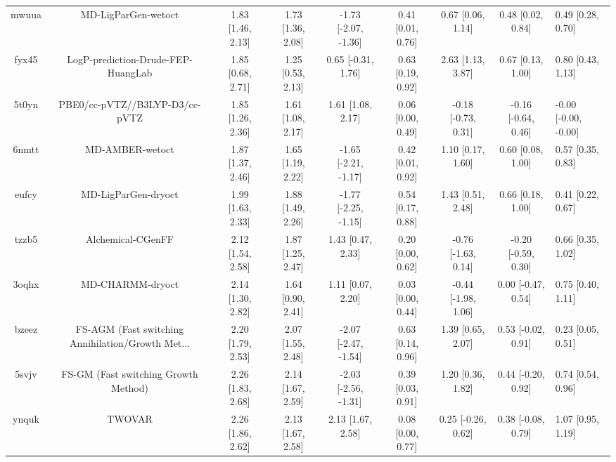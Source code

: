 \documentclass{article}
\begin{document}
\begin{center}
\begin{longtable}{|cccccccc|}
 mwuua &                                MD-LigParGen-wetoct &  1.83 [1.46, 2.13] &  1.73 [1.36, 2.08] &  -1.73 [-2.07, -1.36] &  0.41 [0.01, 0.76] &    0.67 [0.06, 1.14] &    0.48 [0.02, 0.84] &     0.49 [0.28, 0.70] \\
 fyx45 &                 LogP-prediction-Drude-FEP-HuangLab &  1.85 [0.68, 2.71] &  1.25 [0.53, 2.13] &    0.65 [-0.31, 1.76] &  0.63 [0.19, 0.92] &    2.63 [1.13, 3.87] &    0.67 [0.13, 1.00] &     0.80 [0.43, 1.13] \\
 5t0yn &                     PBE0/cc-pVTZ//B3LYP-D3/cc-pVTZ &  1.85 [1.26, 2.36] &  1.61 [1.08, 2.17] &     1.61 [1.08, 2.17] &  0.06 [0.00, 0.49] &  -0.18 [-0.73, 0.31] &  -0.16 [-0.64, 0.46] &  -0.00 [-0.00, -0.00] \\
 6nmtt &                                    MD-AMBER-wetoct &  1.87 [1.37, 2.46] &  1.65 [1.19, 2.22] &  -1.65 [-2.21, -1.17] &  0.42 [0.01, 0.92] &    1.10 [0.17, 1.60] &    0.60 [0.08, 1.00] &     0.57 [0.35, 0.83] \\
 eufcy &                                MD-LigParGen-dryoct &  1.99 [1.63, 2.33] &  1.88 [1.49, 2.26] &  -1.77 [-2.25, -1.15] &  0.54 [0.17, 0.88] &    1.43 [0.51, 2.48] &    0.66 [0.18, 1.00] &     0.41 [0.22, 0.67] \\
 tzzb5 &                                  Alchemical-CGenFF &  2.12 [1.54, 2.58] &  1.87 [1.25, 2.47] &     1.43 [0.47, 2.33] &  0.20 [0.00, 0.62] &  -0.76 [-1.63, 0.14] &  -0.20 [-0.59, 0.30] &     0.66 [0.35, 1.02] \\
 3oqhx &                                   MD-CHARMM-dryoct &  2.14 [1.30, 2.82] &  1.64 [0.90, 2.41] &     1.11 [0.07, 2.20] &  0.03 [0.00, 0.44] &  -0.44 [-1.98, 1.06] &   0.00 [-0.47, 0.54] &     0.75 [0.40, 1.11] \\
 bzeez &  FS-AGM (Fast switching Annihilation/Growth Met... &  2.20 [1.79, 2.53] &  2.07 [1.55, 2.48] &  -2.07 [-2.47, -1.54] &  0.63 [0.14, 0.96] &    1.39 [0.65, 2.07] &   0.53 [-0.02, 0.91] &     0.23 [0.05, 0.51] \\
 5svjv &               FS-GM (Fast switching Growth Method) &  2.26 [1.83, 2.68] &  2.14 [1.67, 2.59] &  -2.03 [-2.56, -1.31] &  0.39 [0.03, 0.91] &    1.20 [0.36, 1.82] &   0.44 [-0.20, 0.92] &     0.74 [0.54, 0.96] \\
 ynquk &                                             TWOVAR &  2.26 [1.86, 2.62] &  2.13 [1.67, 2.58] &     2.13 [1.67, 2.58] &  0.08 [0.00, 0.77] &   0.25 [-0.26, 0.62] &   0.38 [-0.08, 0.79] &     1.07 [0.95, 1.19] \\

\end{longtable}
\end{center}
\end{document}

